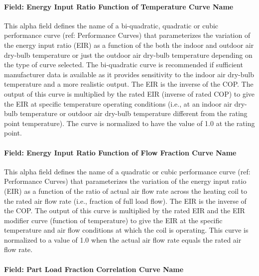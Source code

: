 \paragraph{Field: Energy Input Ratio Function of Temperature Curve Name}\label{field-energy-input-ratio-function-of-temperature-curve-name-3}

This alpha field defines the name of a bi-quadratic, quadratic or cubic performance curve (ref: Performance Curves) that parameterizes the variation of the energy input ratio (EIR) as a function of the both the indoor and outdoor air dry-bulb temperature or just the outdoor air dry-bulb temperature depending on the type of curve selected. The bi-quadratic curve is recommended if sufficient manufacturer data is available as it provides sensitivity to the indoor air dry-bulb temperature and a more realistic output. The EIR is the inverse of the COP. The output of this curve is multiplied by the rated EIR (inverse of rated COP) to give the EIR at specific temperature operating conditions (i.e., at an indoor air dry-bulb temperature or outdoor air dry-bulb temperature different from the rating point temperature). The curve is normalized to have the value of 1.0 at the rating point.

\paragraph{Field: Energy Input Ratio Function of Flow Fraction Curve Name}\label{field-energy-input-ratio-function-of-flow-fraction-curve-name-3}

This alpha field defines the name of a quadratic or cubic performance curve (ref: Performance Curves) that parameterizes the variation of the energy input ratio (EIR) as a function of the ratio of actual air flow rate across the heating coil to the rated air flow rate (i.e., fraction of full load flow). The EIR is the inverse of the COP. The output of this curve is multiplied by the rated EIR and the EIR modifier curve (function of temperature) to give the EIR at the specific temperature and air flow conditions at which the coil is operating. This curve is normalized to a value of 1.0 when the actual air flow rate equals the rated air flow rate.

\paragraph{Field: Part Load Fraction Correlation Curve Name}\label{field-part-load-fraction-correlation-curve-name-6}

